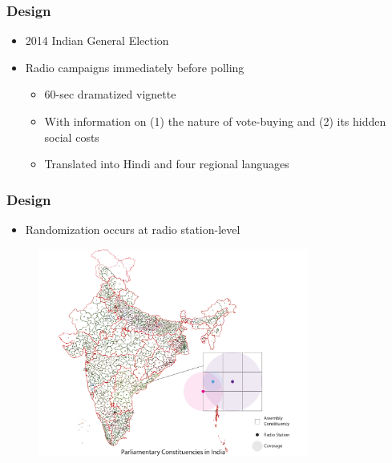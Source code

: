 \documentclass{beamer}
\begin{document}
\begin{frame}
\frametitle{Design}
\begin{itemize}
\item 2014 Indian General Election
\item Radio campaigns immediately before polling
	\begin{itemize}
	\item 60-sec dramatized vignette 
	\item With information on (1) the nature of vote-buying and (2) its hidden social costs
	\item Translated into Hindi and four regional languages
	\end{itemize}
\end{itemize}

\end{frame}


\begin{frame}
\frametitle{Design}
\begin{itemize}
\item Randomization occurs at radio station-level
\end{itemize}


\begin{figure}[!htbp]
\centering
    \includegraphics[width=3.5in]{../Figures/PC.pdf}
\end{figure}

\end{frame}
\end{document}
